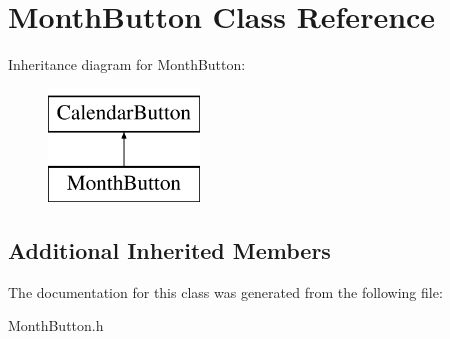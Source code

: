 \hypertarget{interface_month_button}{\section{Month\+Button Class Reference}
\label{interface_month_button}
}
Inheritance diagram for Month\+Button\+:\begin{figure}[H]
\begin{center}
\leavevmode
\includegraphics[height=3.000000cm]{interface_month_button}
\end{center}
\end{figure}
\subsection*{Additional Inherited Members}


The documentation for this class was generated from the following file\+:\begin{DoxyCompactItemize}
\item 
Month\+Button.\+h\end{DoxyCompactItemize}
